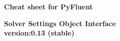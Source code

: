 \documentclass[9pt,landscape]{article}
\begin{document}
\raggedright
\footnotesize


\begin{center}
     \Huge{\textbf{Cheat sheet for PyFluent}} \\
\end{center}
\begin{center}
     \Large{\textbf{Solver Settings Object Interface}} \\
     \small{\textbf{version:0.13 (stable) }} \\
\end{center}

\vspace{-0.15cm}
\noindent\makebox[\linewidth]{\rule{\paperwidth}{2pt}}
\end{document}
